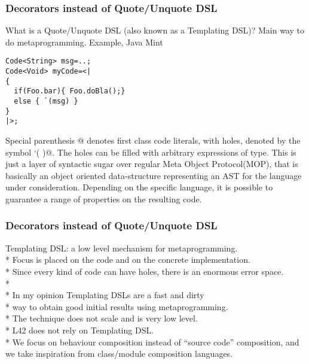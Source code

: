 \begin{frame}[fragile]
\frametitle{Decorators instead of Quote/Unquote DSL}
What is a Quote/Unquote DSL (also known as a Templating DSL)?
Main way to do metaprogramming.
Example, Java Mint
\begin{NiceCode}{59ex}{0.8}
\begin{lstlisting}
Code<String> msg=..;
Code<Void> myCode=<|
{
  if(Foo.bar){ Foo.doBla();}
  else { `(msg) }
}
|>;
\end{lstlisting}
\end{NiceCode}
Special parenthesis \Q@<|  |>@ denotes first class code literals,
with holes, denoted by the symbol \Q@`( )@.
The holes can be filled with arbitrary expressions of \Q@Code@ type.
This is just a layer of syntactic sugar over regular 
Meta Object Protocol(MOP), that is basically an object oriented data-structure representing
an AST for the language under consideration.
Depending on the specific language,
it is possible to guarantee a range of properties on the resulting code.
\end{frame}

\begin{frame}[fragile]
\frametitle{Decorators instead of Quote/Unquote DSL}

Templating DSL: a low level mechanism for metaprogramming.\\*
Focus is placed on the code and on the concrete implementation.\\*
Since every kind of code can have holes, there is an enormous error space.\\*
${}_{}$\\*
In my opinion Templating DSLs are a fast and dirty \\*
way to obtain good initial results using metaprogramming.\\*
The technique does not scale and is very low level.
${}_{}$\\*
L42 does \alert{not} rely on Templating DSL.\\*
We focus on behaviour composition instead of ``source code'' composition,
and we take inspiration from class/module composition languages.
\end{frame}




